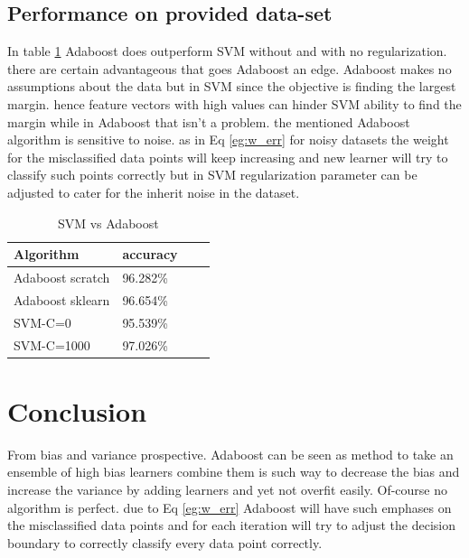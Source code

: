 \documentclass[10pt,twocolumn,letterpaper]{article}
\begin{document}
\vspace{3.00mm} 







\subsection{Performance on provided data-set}
In table \ref{tab:results} Adaboost does outperform SVM without and with no regularization. there are certain advantageous that goes Adaboost an edge. Adaboost makes no assumptions about the data but in SVM since the objective is finding the largest margin. hence feature vectors with high values can hinder SVM ability to find the margin while in Adaboost that isn't a problem. the mentioned Adaboost algorithm is sensitive to noise. as in Eq \ref{eg:w_err} for noisy datasets the weight for the misclassified data points will keep increasing and new learner will try to classify such points correctly but in SVM regularization parameter can be adjusted to cater for the inherit noise in the dataset. 



\begin{table}[htb]
\centering
\begin{tabular}{|l|l|l|l|} 
\toprule
Algorithm            & accuracy  \\ 
\hline
Adaboost scratch     & 96.282\%      \\ 
\hline
Adaboost sklearn     & 96.654\%      \\ 
\hline
SVM-C=0              & 95.539\%      \\
\hline
SVM-C=1000           & 97.026\%      \\
\bottomrule
\end{tabular}
\caption{SVM vs Adaboost}
\label{tab:results}
\end{table}





\section{Conclusion}

From bias and variance prospective. Adaboost can be seen as method to take an ensemble of high bias learners combine them is such way to decrease the bias and increase the variance by adding learners and yet not overfit easily. Of-course no algorithm is perfect. due to Eq \ref{eg:w_err} Adaboost will have such emphases on the misclassified data points and for each iteration will try to adjust the decision boundary to correctly classify every data point correctly. 


% 
%
\end{document}

